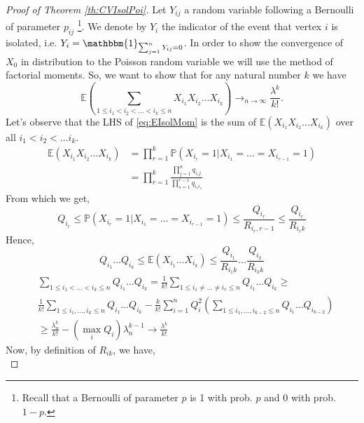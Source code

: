 \begin{proof}[Proof of Theorem \ref{th:CVIsolPoi}]
	Let $Y_{ij}$ a random variable following a Bernoulli of parameter $p_{ij}$
	\footnote{ Recall that a Bernoulli of parameter $p$ is 1 with prob. $p$ and 0 with prob. $1-p$.}.
	We denote by $Y_i$ the indicator of the event that vertex $i$ is isolated, i.e. $Y_i = \mathbbm{1}_{\sum_{j=1}^n Y_{ij} = 0}$.
	In order to show the convergence of $X_0$ in distribution to the Poisson random variable we will use the method of factorial moments.
	So, we want to show that for any natural number $k$ we have
	\begin{equation}\label{eq:EIsolMom}
		\mathbb{E}(\sum_{1\leq i_1<i_2< \ldots < i_k \leq n} X_{i_1}X_{i_2}\ldots X_{i_k}) \to_{n \to \infty} \frac{\lambda^k}{k!}.
	\end{equation}
	Let's observe that the LHS of \eqref{eq:EIsolMom} is the sum of $\mathbb{E}(X_{i_1}X_{i_2}\ldots X_{i_k})$ over all $i_1 < i_2 < \ldots i_k$.
	\begin{align}
		\mathbb{E}(X_{i_1}X_{i_2}\ldots X_{i_k}) 	&= \prod_{r=1}^k \mathbb{P}(X_{i_r} = 1 | X_{i_1} = \ldots = X_{i_{r-1}} = 1) \\
							&= \prod_{r=1}^k\frac{ \prod_{j=1}^n q_{i_r j} }{ \prod_{s=1}^{r-1}q_{i_r i_s}}
	\end{align}
	From which we get,
	\begin{equation}
		Q_{i_r} \leq \mathbb{P}(X_{i_r} = 1 | X_{i_1} = \ldots = X_{i_{r-1}} = 1) \leq \frac{Q_{i_r}}{R_{i_r, r-1}} \leq \frac{Q_{i_r}}{R_{i_r k}} 
	\end{equation}
	Hence,
	\begin{equation}
		Q_{i_1} \ldots Q_{i_k} \leq \mathbb{E}(X_{i_1}\ldots X_{i_k}) \leq \frac{Q_{i_1}}{R_{i_1 k}} \ldots \frac{Q_{i_k}}{R_{i_k k}}
	\end{equation}
 	\begin{align}\label{eq:CVDOWN}
		&\sum_{1\leq i_1 < \ldots < i_k \leq n} Q_{i_1} \ldots Q_{i_k} = \frac{1}{k!}\sum_{1 \leq i_1 \neq \ldots \neq i_r \leq n} Q_{i_1} \ldots Q_{i_k} \geq\\
	     & \frac{1}{k!} \sum_{1\leq i_1, \ldots, i_k \leq n} Q_{i_1}\ldots Q_{i_k} 
		- \frac{k}{k!}\sum_{i=1}^n Q_i^2(\sum_{1 \leq i_1, \ldots, i_{k-2} \leq n} Q_{i_1} \ldots Q_{i_{k-2}})\\
		&\geq \frac{\lambda_n^k}{k!} - (\max_i Q_i)\lambda_n^{k-1} \longrightarrow \frac{\lambda^k}{k!}
 	\end{align}
 	Now, by definition of $R_{ik}$, we have,
 	\begin{equation}

\end{equation}
\end{proof}
